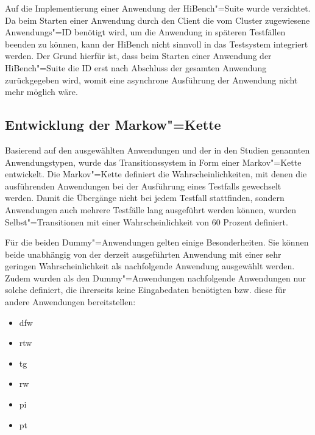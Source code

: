 Auf die Implementierung einer Anwendung der HiBench"=Suite wurde verzichtet.
Da beim Starten einer Anwendung durch den Client die vom Cluster zugewiesene Anwendungs"=ID benötigt wird, um die Anwendung in späteren Testfällen beenden zu können, kann der HiBench nicht sinnvoll in das Testsystem integriert werden.
Der Grund hierfür ist, dass beim Starten einer Anwendung der HiBench"=Suite die ID erst nach Abschluss der gesamten Anwendung zurückgegeben wird, womit eine asynchrone Ausführung der Anwendung nicht mehr möglich wäre.

\subsection{Entwicklung der Markow"=Kette}
\label{subsec:markovChain}

Basierend auf den ausgewählten Anwendungen und der in den Studien genannten Anwendungstypen, wurde das Transitionssystem in Form einer Markov"=Kette entwickelt.
Die Markov"=Kette definiert die Wahrscheinlichkeiten, mit denen die ausführenden Anwendungen bei der Ausführung eines Testfalls gewechselt werden.
Damit die Übergänge nicht bei jedem Testfall stattfinden, sondern Anwendungen auch mehrere Testfälle lang ausgeführt werden können, wurden Selbst"=Transitionen mit einer Wahrscheinlichkeit von 60 Prozent definiert.

Für die beiden Dummy"=Anwendungen gelten einige Besonderheiten.
Sie können beide unabhängig von der derzeit ausgeführten Anwendung mit einer sehr geringen Wahrscheinlichkeit als nachfolgende Anwendung ausgewählt werden.
Zudem wurden als den Dummy"=Anwendungen nachfolgende Anwendungen nur solche definiert, die ihrerseits keine Eingabedaten benötigten bzw. diese für andere Anwendungen bereitstellen:

\begin{itemize}
    \item \acrlong{dfw}
    \item \acrlong{rtw}
    \item \acrlong{tg}
    \item \acrlong{rw}
    \item \acrlong{pi}
    \item \acrlong{pt}
\end{itemize}

